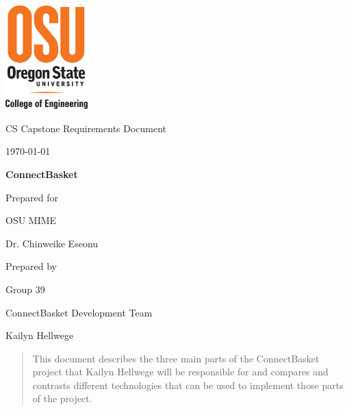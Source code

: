 \documentclass[onecolumn, draftclsnofoot,10pt, compsoc]{IEEEtran}
\def \CapstoneTeamName{		ConnectBasket Development Team}
\def \CapstoneTeamNumber{		39}
\def \GroupMemberOne{			Kailyn Hellwege}
\def \CapstoneProjectName{		ConnectBasket}
\def \CapstoneSponsorCompany{	OSU MIME}
\def \CapstoneSponsorPerson{		Dr. Chinweike Eseonu}
\def \DocType{		%
				Requirements Document
				}
\newcommand{\NameSigPair}[1]{\par
\makebox[2.75in][r]{#1} \hfil 	\makebox[3.25in]{\makebox[2.25in]{\hrulefill} \hfill		\makebox[.75in]{\hrulefill}}
\par\vspace{-12pt} \textit{\tiny\noindent
\makebox[2.75in]{} \hfil		\makebox[3.25in]{\makebox[2.25in][r]{Signature} \hfill	\makebox[.75in][r]{Date}}}}
\renewcommand{\NameSigPair}[1]{#1}
\begin{document}
\begin{titlepage}
    \begin{singlespace}
    	\includegraphics[height=4cm]{coe_v_spot1}
        \hfill 
        \par\vspace{.2in}
        \centering
        \scshape{
            \huge CS Capstone \DocType \par
            {\large\today}\par
            \vspace{.5in}
            \textbf{\Huge\CapstoneProjectName}\par
            \vfill
            {\large Prepared for}\par
            \Huge \CapstoneSponsorCompany\par
            \vspace{5pt}
            {\Large\NameSigPair{\CapstoneSponsorPerson}\par}
            {\large Prepared by }\par
            Group\CapstoneTeamNumber\par
            \CapstoneTeamName\par 
            \vspace{5pt}
            {\Large
                \NameSigPair{\GroupMemberOne}\par
            }
            \vspace{20pt}
        }
        \begin{abstract}
        This document describes the three main parts of the ConnectBasket project that Kailyn Hellwege will be responsible for and compares and contrasts different technologies that can be used to implement those parts of the project.
        \end{abstract}     
    \end{singlespace}
\end{titlepage}
\newpage
{}
\tableofcontents
\clearpage
\end{document}
